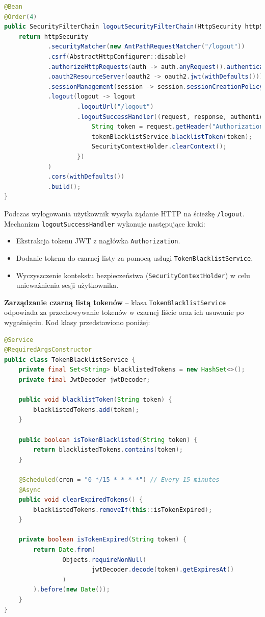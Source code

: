 \begin{lstlisting}[language=Java, caption=Konfiguracja łańcucha wylogowania]
@Bean
@Order(4)
public SecurityFilterChain logoutSecurityFilterChain(HttpSecurity httpSecurity) throws Exception {
    return httpSecurity
            .securityMatcher(new AntPathRequestMatcher("/logout"))
            .csrf(AbstractHttpConfigurer::disable)
            .authorizeHttpRequests(auth -> auth.anyRequest().authenticated())
            .oauth2ResourceServer(oauth2 -> oauth2.jwt(withDefaults()))
            .sessionManagement(session -> session.sessionCreationPolicy(SessionCreationPolicy.STATELESS))
            .logout(logout -> logout
                    .logoutUrl("/logout")
                    .logoutSuccessHandler((request, response, authentication) -> {
                        String token = request.getHeader("Authorization").replace("Bearer ", "");
                        tokenBlacklistService.blacklistToken(token);
                        SecurityContextHolder.clearContext();
                    })
            )
            .cors(withDefaults())
            .build();
}
\end{lstlisting}

Podczas wylogowania użytkownik wysyła żądanie HTTP na ścieżkę \texttt{/logout}. Mechanizm \texttt{logoutSuccessHandler} wykonuje następujące kroki:
\begin{itemize}
    \item Ekstrakcja tokenu JWT z nagłówka \texttt{Authorization}.
    \item Dodanie tokenu do czarnej listy za pomocą usługi \texttt{TokenBlacklistService}.
    \item Wyczyszczenie kontekstu bezpieczeństwa (\texttt{SecurityContextHolder}) w celu unieważnienia sesji użytkownika.
\end{itemize}

\textbf{Zarządzanie czarną listą tokenów} -- klasa \texttt{TokenBlacklistService} odpowiada za przechowywanie tokenów w czarnej liście oraz ich usuwanie po wygaśnięciu. Kod klasy przedstawiono poniżej:

\begin{lstlisting}[language=Java, caption=Klasa \texttt{TokenBlacklistService}]
@Service
@RequiredArgsConstructor
public class TokenBlacklistService {
    private final Set<String> blacklistedTokens = new HashSet<>();
    private final JwtDecoder jwtDecoder;

    public void blacklistToken(String token) {
        blacklistedTokens.add(token);
    }

    public boolean isTokenBlacklisted(String token) {
        return blacklistedTokens.contains(token);
    }

    @Scheduled(cron = "0 */15 * * * *") // Every 15 minutes
    @Async
    public void clearExpiredTokens() {
        blacklistedTokens.removeIf(this::isTokenExpired);
    }

    private boolean isTokenExpired(String token) {
        return Date.from(
                Objects.requireNonNull(
                        jwtDecoder.decode(token).getExpiresAt()
                )
        ).before(new Date());
    }
}
\end{lstlisting}

